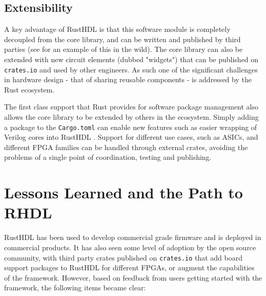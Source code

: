\documentclass[conference]{IEEEtran}
\begin{document}
\subsection{Extensibility}

A key advantage of RustHDL is that this software module is completely decoupled
from the core library, and can be written and published by third parties (see \cite{b7} for an example of this in the wild).  
The core library can also be extended with new circuit elements (dubbed "widgets") that can be published on 
\verb|crates.io| and used by other engineers. As such one of the significant challenges in hardware design - 
that of sharing reusable components - is addressed by the Rust ecosystem.

The first class support that Rust provides for software package management also allows the core library to be extended
by others in the ecosystem.  Simply adding a package to the \verb|Cargo.toml| can enable new features such as 
easier wrapping of Verilog cores into RustHDL \cite{b8}.  Support for different use cases, such as ASICs, and different
FPGA families can be handled through external crates, avoiding the problems of a single point of coordination, testing
and publishing.

\section{Lessons Learned and the Path to RHDL}\label{sec:future}

RustHDL has been used to develop commercial grade firmware and is deployed in commercial products.  It has also seen 
some level of adoption by the open source community, with third party crates published on \verb|crates.io| that add board
support packages to RustHDL for different FPGAs, or augment the capabilities of the framework.  However, based on
feedback from users getting started with the framework, the following items became clear:
\end{document}
